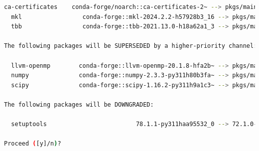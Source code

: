 \documentclass[11pt,a4paper]{article}
\begin{document}
\begin{itemize}
\begin{lstlisting}[language=bash, caption=Output instalansi library]
  ca-certificates    conda-forge/noarch::ca-certificates-2~ --> pkgs/main/win-64::ca-certificates-2025.9.9-haa95532_0
  mkl                 conda-forge::mkl-2024.2.2-h57928b3_16 --> pkgs/main::mkl-2025.0.0-h5da7b33_930
  tbb                 conda-forge::tbb-2021.13.0-h18a62a1_3 --> pkgs/main::tbb-2022.0.0-h214f63a_0

The following packages will be SUPERSEDED by a higher-priority channel:

  llvm-openmp        conda-forge::llvm-openmp-20.1.8-hfa2b~ --> pkgs/main::llvm-openmp-20.1.8-h29ce207_0
  numpy              conda-forge::numpy-2.3.3-py311h80b3fa~ --> pkgs/main::numpy-2.3.3-py311hc2e1e29_0
  scipy              conda-forge::scipy-1.16.2-py311h9a1c3~ --> pkgs/main::scipy-1.16.1-py311h86a6471_0

The following packages will be DOWNGRADED:

  setuptools                         78.1.1-py311haa95532_0 --> 72.1.0-py311haa95532_0

Proceed ([y]/n)?



\end{lstlisting}
\end{itemize}
\end{document}
